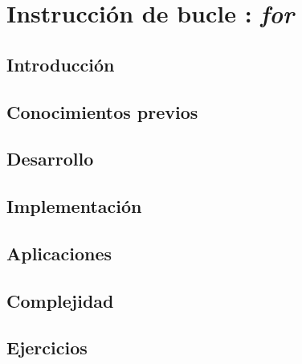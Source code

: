 \chapter{Instrucción de bucle : \emph{for} }
\section{Introducción}

\section{Conocimientos previos}

\section{Desarrollo}

\section{Implementación}

\section{Aplicaciones}

\section{Complejidad}

\section{Ejercicios}

